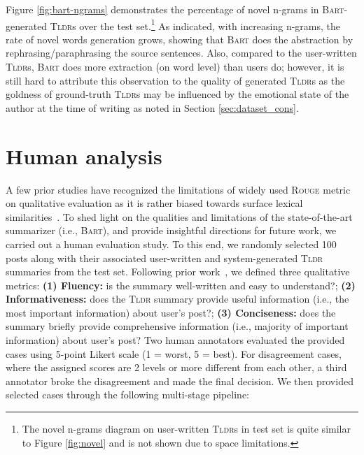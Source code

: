 \documentclass[10pt, a4paper]{article}
\newcommand{\bart}{\textsc{Bart}}
\newcommand{\tldr}{\textsc{Tldr}}
\begin{document}
Figure \ref{fig:bart-ngrams} demonstrates the percentage of novel n-grams in \bart -generated \tldr s over the test set.\footnote{The novel n-grams diagram on user-written \tldr s in test set is quite similar to Figure \ref{fig:novel} and is not shown due to space limitations.} As indicated, with increasing n-grams, the rate of novel words generation grows, showing that \bart{} does the abstraction by rephrasing/paraphrasing the source sentences. Also, compared to the user-written \tldr s, \bart{} does more extraction (on word level) than users do; however, it is still hard to attribute this observation to the quality of generated \tldr s as the goldness of ground-truth \tldr s may be influenced by the emotional state of the author at the time of writing as noted in Section \ref{sec:dataset_cons}.

\section{Human analysis}
\label{sec:human}
A few prior studies have recognized the limitations of widely used \textsc{Rouge} metric on qualitative evaluation as it is rather biased towards surface lexical similarities~\cite{Ng2015BetterSE,Cohan2016RevisitingSE}. To shed light on the qualities and limitations of the state-of-the-art summarizer (i.e., \bart), and provide insightful directions for future work, we carried out a human evaluation study. To this end, we randomly selected 100 posts along with their associated user-written and system-generated \tldr{} summaries from the test set. Following prior work~\cite{Grusky2018NewsroomAD,Zhang2020OptimizingTF,Cho2021StreamHoverLT,sotudeh-etal-2021-tldr9}, we defined three qualitative metrics: \textbf{(1) Fluency:} is the summary well-written and easy to understand?; \textbf{(2) Informativeness:} does the \tldr{} summary provide useful information (i.e., the most important information) about user's post?; \textbf{(3) Conciseness:} does the summary briefly provide comprehensive information (i.e., majority of important information) about user's post? Two human annotators evaluated the provided cases using 5-point Likert scale (1 = worst, 5 = best). For disagreement cases, where the assigned scores are 2 levels or more different from each other, a third annotator broke the disagreement and made the final decision. We then provided selected cases through the following multi-stage pipeline:
\end{document}
